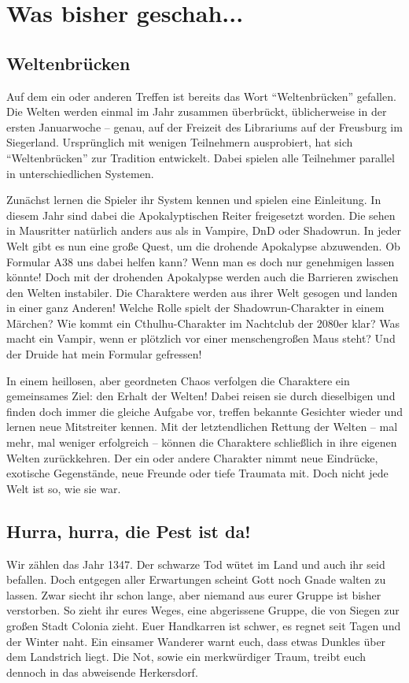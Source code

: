 \documentclass[final]{multiversum}
\begin{document}
\makemultititle
%

\section{Was bisher geschah...}

\subsection{Weltenbrücken}
Auf dem ein oder anderen Treffen ist bereits das Wort \enquote{Weltenbrücken} gefallen.
Die Welten werden einmal im Jahr zusammen überbrückt, üblicherweise in der ersten Januarwoche -- genau, auf der Freizeit des Librariums auf der Freusburg im Siegerland.
Ursprünglich mit wenigen Teilnehmern ausprobiert, hat sich \enquote{Weltenbrücken} zur Tradition entwickelt.
Dabei spielen alle Teilnehmer parallel in unterschiedlichen Systemen.

Zunächst lernen die Spieler ihr System kennen und spielen eine Einleitung.
In diesem Jahr sind dabei die Apokalyptischen Reiter freigesetzt worden.
Die sehen in Mausritter natürlich anders aus als in Vampire, DnD oder Shadowrun.
In jeder Welt gibt es nun eine große Quest, um die drohende Apokalypse abzuwenden.
Ob Formular A38 uns dabei helfen kann? Wenn man es doch nur genehmigen lassen könnte!
Doch mit der drohenden Apokalypse werden auch die Barrieren zwischen den Welten instabiler.
Die Charaktere werden aus ihrer Welt gesogen und landen in einer ganz Anderen!
Welche Rolle spielt der Shadowrun-Charakter in einem Märchen?
Wie kommt ein Cthulhu-Charakter im Nachtclub der 2080er klar?
Was macht ein Vampir, wenn er plötzlich vor einer menschengroßen Maus steht?
Und der Druide hat mein Formular gefressen!

In einem heillosen, aber geordneten Chaos verfolgen die Charaktere ein gemeinsames Ziel: den Erhalt der Welten!
Dabei reisen sie durch dieselbigen und finden doch immer die gleiche Aufgabe vor, treffen bekannte Gesichter wieder und lernen neue Mitstreiter kennen.
Mit der letztendlichen Rettung der Welten -- mal mehr, mal weniger erfolgreich -- können die Charaktere schließlich in ihre eigenen Welten zurückkehren.
Der ein oder andere Charakter nimmt neue Eindrücke, exotische Gegenstände, neue Freunde oder tiefe Traumata mit.
Doch nicht jede Welt ist so, wie sie war.

\subsection{Hurra, hurra, die Pest ist da!}
Wir zählen das Jahr 1347. 
Der schwarze Tod wütet im Land und auch ihr seid befallen.
Doch entgegen aller Erwartungen scheint Gott noch Gnade walten zu lassen.
Zwar siecht ihr schon lange, aber niemand aus eurer Gruppe ist bisher verstorben.
So zieht ihr eures Weges, eine abgerissene Gruppe, die von Siegen zur großen Stadt Colonia zieht.
Euer Handkarren ist schwer, es regnet seit Tagen und der Winter naht.
Ein einsamer Wanderer warnt euch, dass etwas Dunkles über dem Landstrich liegt.
Die Not, sowie ein merkwürdiger Traum, treibt euch dennoch in das abweisende Herkersdorf.
\end{document}
